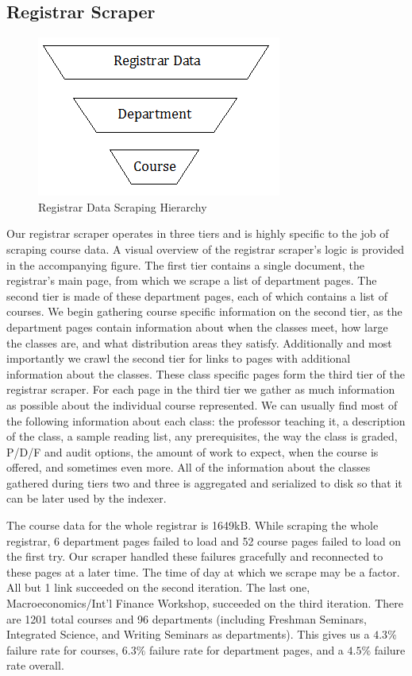 \documentclass[12pt,letterpaper]{article}
\begin{document}
\subsection{Registrar Scraper}

\begin{figure}
\begin{center}
\includegraphics{RegistrarDiagram.png}
\end{center}
\caption{Registrar Data Scraping Hierarchy}
\end{figure}

Our registrar scraper operates in three tiers and is highly specific to the job of scraping course data. A visual overview of the registrar scraper's logic is provided in the accompanying figure. The first tier contains a single document, the registrar's main page, from which we scrape a list of department pages. The second tier is made of these department pages, each of which contains a list of courses. We begin gathering course specific information on the second tier, as the department pages contain information about when the classes meet, how large the classes are, and what distribution areas they satisfy. Additionally and most importantly we crawl the second tier for links to pages with additional information about the classes. These class specific pages form the third tier of the registrar scraper. For each page in the third tier we gather as much information as possible about the individual course represented. We can usually find most of the following information about each class: the professor teaching it, a description of the class, a sample reading list, any prerequisites, the way the class is graded, P/D/F and audit options, the amount of work to expect, when the course is offered, and sometimes even more. All of the information about the classes gathered during tiers two and three is aggregated and serialized to disk so that it can be later used by the indexer.

The course data for the whole registrar is 1649kB. While scraping the whole registrar, 6 department pages failed to load and 52 course pages failed to load on the first try. Our scraper handled these failures gracefully and reconnected to these pages at a later time. The time of day at which we scrape may be a factor. All but 1 link succeeded on the second iteration. The last one, Macroeconomics/Int'l Finance Workshop, succeeded on the third iteration. There are 1201 total courses and 96 departments (including Freshman Seminars, Integrated Science, and Writing Seminars as departments). This gives us a $4.3\%$ failure rate for courses, $6.3\%$ failure rate for department pages, and a $4.5\%$ failure rate overall. 
\end{document}
